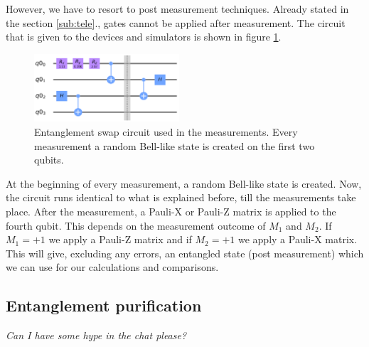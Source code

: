 However, we have to resort to post measurement techniques. Already stated in the section \ref{sub:tele}., gates cannot be applied after measurement. The circuit that is given to the devices and simulators is shown in figure \ref{fig:swapcir}.
\begin{figure}[h]
	\includegraphics[width=0.48\textwidth]{images/swap_circuit.png}
	\caption{Entanglement swap circuit used in the measurements. Every measurement a random Bell-like state is created on the first two qubits.}
	\label{fig:swapcir}
\end{figure}
At the beginning of every measurement, a random Bell-like state is created. Now, the circuit runs identical to what is explained before, till the measurements take place. After the measurement, a Pauli-X or Pauli-Z matrix is applied to the fourth qubit. This depends on the measurement outcome of $M_1$ and $M_2$. If $M_1 = +1$ we apply a Pauli-Z matrix and if $M_2 = +1$ we apply a Pauli-X matrix. This will give, excluding any errors, an entangled state (post measurement) which we can use for our calculations and comparisons.

\subsection{Entanglement purification}
\emph{Can I have some hype in the chat please?}